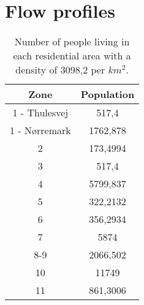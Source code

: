 \newpage
\section{Flow profiles}\label{app:flow_profiles}



\begin{table}[H]
\centering
\begin{tabular}{|c|c|}
\hline
\textbf{Zone} & \textbf{Population} \\ \hline
1 - Thulesvej & 517,4                \\ \hline
1 - Nørremark & 1762,878             \\ \hline
2             & 173,4994             \\ \hline
3             & 517,4                \\ \hline
4             & 5799,837             \\ \hline
5             & 322,2132             \\ \hline
6             & 356,2934             \\ \hline
7             & 5874                 \\ \hline
8-9           & 2066,502             \\ \hline
10            & 11749                \\ \hline
11            & 861,3006             \\ \hline
\end{tabular}
\caption{Number of people living in each residential area with a density of 3098,2 per $km^2$.}
\label{tab:population_in_the_residential_area}
\end{table}